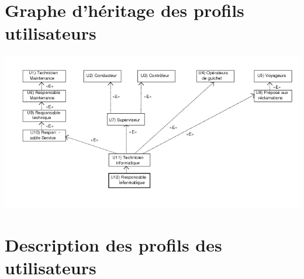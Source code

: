 \part{Graphe d'héritage des profils utilisateurs}
\includegraphics[width=\linewidth]{../../GPU/src/img/GPU.png}
\newpage

\part{Description des profils des utilisateurs}

\newpage

